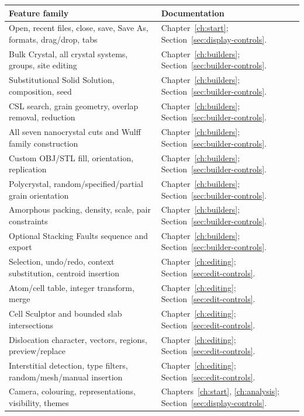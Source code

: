 \begin{longtable}{p{.47\linewidth}p{.44\linewidth}}
\toprule Feature family & Documentation \\ \midrule\endhead
Open, recent files, close, save, Save As, formats, drag/drop, tabs & Chapter~\ref{ch:start}; Section~\ref{sec:display-controls}. \\
Bulk Crystal, all crystal systems, groups, site editing & Chapter~\ref{ch:builders}; Section~\ref{sec:builder-controls}. \\
Substitutional Solid Solution, composition, seed & Chapter~\ref{ch:builders}; Section~\ref{sec:builder-controls}. \\
CSL search, grain geometry, overlap removal, reduction & Chapter~\ref{ch:builders}; Section~\ref{sec:builder-controls}. \\
All seven nanocrystal cuts and Wulff family construction & Chapter~\ref{ch:builders}; Section~\ref{sec:builder-controls}. \\
Custom OBJ/STL fill, orientation, replication & Chapter~\ref{ch:builders}; Section~\ref{sec:builder-controls}. \\
Polycrystal, random/specified/partial grain orientation & Chapter~\ref{ch:builders}; Section~\ref{sec:builder-controls}. \\
Amorphous packing, density, scale, pair constraints & Chapter~\ref{ch:builders}; Section~\ref{sec:builder-controls}. \\
Optional Stacking Faults sequence and export & Chapter~\ref{ch:builders}; Section~\ref{sec:builder-controls}. \\
Selection, undo/redo, context substitution, centroid insertion & Chapter~\ref{ch:editing}; Section~\ref{sec:edit-controls}. \\
Atom/cell table, integer transform, merge & Chapter~\ref{ch:editing}; Section~\ref{sec:edit-controls}. \\
Cell Sculptor and bounded slab intersections & Chapter~\ref{ch:editing}; Section~\ref{sec:edit-controls}. \\
Dislocation character, vectors, regions, preview/replace & Chapter~\ref{ch:editing}; Section~\ref{sec:edit-controls}. \\
Interstitial detection, type filters, random/mesh/manual insertion & Chapter~\ref{ch:editing}; Section~\ref{sec:edit-controls}. \\
Camera, colouring, representations, visibility, themes & Chapters~\ref{ch:start}, \ref{ch:analysis}; Section~\ref{sec:display-controls}. \\

\end{longtable}
